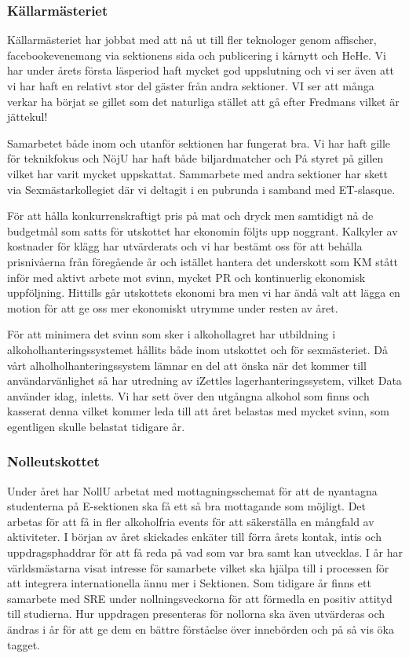 \documentclass[../_main/handlingar.tex]{subfiles}
\begin{document}
\newpage

\subsubsection*{Källarmästeriet}

Källarmästeriet har jobbat med att nå ut till fler teknologer genom affischer, facebookevenemang via sektionens sida och publicering i kårnytt och HeHe. Vi har under årets första läsperiod haft mycket god uppslutning och vi ser även att vi har haft en relativt stor del gäster från andra sektioner. VI ser att många verkar ha börjat se gillet som det naturliga stället att gå efter Fredmans vilket är jättekul! 

Samarbetet både inom och utanför sektionen har fungerat bra. Vi har haft gille för teknikfokus och NöjU har haft både biljardmatcher och På styret på gillen vilket har varit mycket uppskattat. Sammarbete med andra sektioner har skett via Sexmästarkollegiet där vi deltagit i en pubrunda i samband med ET-slasque. 

För att hålla konkurrenskraftigt pris på mat och dryck men samtidigt nå de budgetmål som satts för utskottet har ekonomin följts upp noggrant. Kalkyler av kostnader för klägg har utvärderats och vi har bestämt oss för att behålla prisnivåerna från föregående år och istället hantera det underskott som KM stått inför med aktivt arbete mot svinn, mycket PR och kontinuerlig ekonomisk uppföljning. Hittills går utskottets ekonomi bra men vi har ändå valt att lägga en motion för att ge oss mer ekonomiskt utrymme under resten av året.  

För att minimera det svinn som sker i alkohollagret har utbildning i alkoholhanteringssystemet hållits både inom utskottet och för sexmästeriet. Då vårt alholholhanteringssystem lämnar en del att önska när det kommer till användarvänlighet så har utredning av iZettles lagerhanteringssystem, vilket Data använder idag, inletts. Vi har sett över den utgångna alkohol som finns och kasserat denna vilket kommer leda till att året belastas med mycket svinn, som egentligen skulle belastat tidigare år. 


\subsubsection*{Nolleutskottet}

Under året har NollU arbetat med mottagningsschemat för att de nyantagna studenterna på E-sektionen ska få ett så bra mottagande som möjligt. Det arbetas för att få in fler alkoholfria events för att säkerställa en mångfald av aktiviteter. I början av året skickades enkäter till förra årets kontak, intis och uppdragsphaddrar för att få reda på vad som var bra samt kan utvecklas. I år har världsmästarna visat intresse för samarbete vilket ska hjälpa till i processen för att integrera internationella ännu mer i Sektionen. Som tidigare år finns ett samarbete med SRE under nollningsveckorna för att förmedla en positiv attityd till studierna. Hur uppdragen presenteras för nollorna ska även utvärderas och ändras i år för att ge dem en bättre förståelse över innebörden och på så vis öka tagget.
\end{document}
